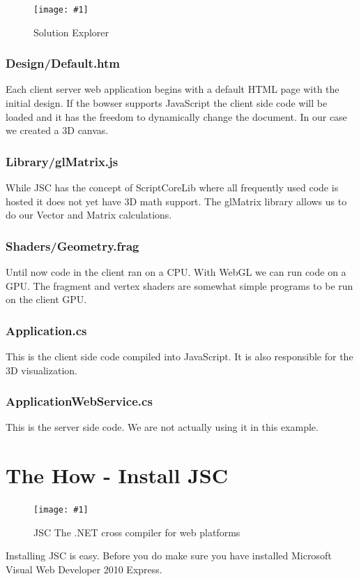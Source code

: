 \documentclass[12pt,leqno]{book}
\newcommand{\png}[1]{\texttt{[image: \#1]}}
\newcommand{\figpng}[2]{\begin{figure}[htb]\centering\png{#1}\caption{#2}\end{figure}}
\begin{document}
\figpng{Images/SpiderModel_-_Microsoft_Visual_Studio-2012-03-14_15.39.19}
{Solution Explorer}

\subsection{Design/Default.htm}
Each client server web application begins with a default HTML page with the initial design. If the bowser supports JavaScript the client side code will be loaded and it has the freedom to dynamically change the document. In our case we created a 3D canvas.

\subsection{Library/glMatrix.js}
While JSC has the concept of ScriptCoreLib where all frequently used code is hosted it does not yet have 3D math support.
The glMatrix library allows us to do our Vector and Matrix calculations.

\subsection{Shaders/Geometry.frag}
Until now code in the client ran on a CPU. With WebGL we can run code on a GPU. The fragment and vertex shaders are somewhat simple programs to be run on the client GPU.

\subsection{Application.cs}
This is the client side code compiled into JavaScript. It is also responsible for the 3D visualization.

\subsection{ApplicationWebService.cs}
This is the server side code. We are not actually using it in this example.

\chapter{The How - Install JSC}


\figpng{Images/jscpromotion1}
{JSC The .NET cross compiler for web platforms}

Installing JSC is easy. Before you do make sure you have installed Microsoft Visual Web Developer 2010 Express.
\end{document}

